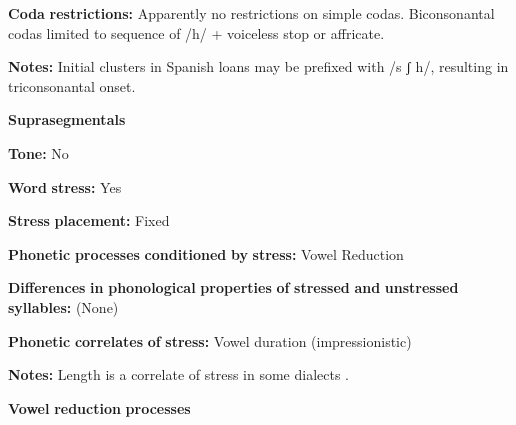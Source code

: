 \begin{styleBody}
\textbf{Coda} \textbf{restrictions:} Apparently no restrictions on simple codas. Biconsonantal codas limited to sequence of /h/ + voiceless stop or affricate.
\end{styleBody}

\begin{styleBody}
\textbf{Notes:} Initial clusters in Spanish loans may be prefixed with /s ʃ h/, resulting in triconsonantal onset.
\end{styleBody}

\begin{styleBody}
\textbf{Suprasegmentals}
\end{styleBody}

\begin{styleBody}
\textbf{Tone:} No
\end{styleBody}

\begin{styleBody}
\textbf{Word} \textbf{stress:} Yes
\end{styleBody}

\begin{styleBody}
\textbf{Stress} \textbf{placement:} Fixed
\end{styleBody}

\begin{styleBody}
\textbf{Phonetic} \textbf{processes} \textbf{conditioned} \textbf{by} \textbf{stress:} Vowel Reduction
\end{styleBody}

\begin{styleBody}
\textbf{Differences} \textbf{in} \textbf{phonological} \textbf{properties} \textbf{of} \textbf{stressed} \textbf{and} \textbf{unstressed} \textbf{syllables:} (None)
\end{styleBody}

\begin{styleBody}
\textbf{Phonetic} \textbf{correlates} \textbf{of} \textbf{stress:} Vowel duration (impressionistic)
\end{styleBody}

\begin{styleBody}
\textbf{Notes:} Length is a correlate of stress in some dialects \citep[23]{Polian2006}.
\end{styleBody}

\begin{styleBody}
\textbf{Vowel} \textbf{reduction} \textbf{processes}
\end{styleBody}

